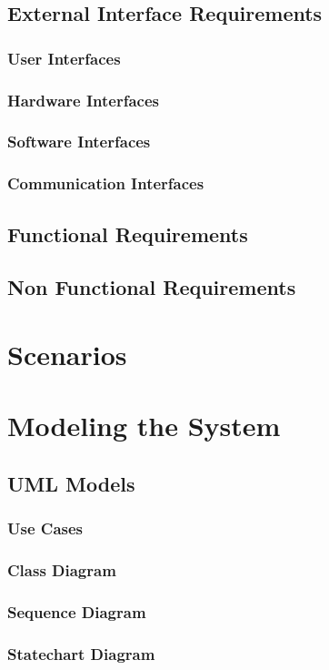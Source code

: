 \documentclass[11pt,a4paper]{report}
\begin{document}
\section{External Interface Requirements}
\subsection{User Interfaces}
\subsection{Hardware Interfaces}
\subsection{Software Interfaces}
\subsection{Communication Interfaces}
\section{Functional Requirements}
\section{Non Functional Requirements}
\chapter{Scenarios}
\chapter{Modeling the System}
\section{UML Models}
\subsection{Use Cases}
\subsection{Class Diagram}
\subsection{Sequence Diagram}
\subsection{Statechart Diagram}
\end{document}
